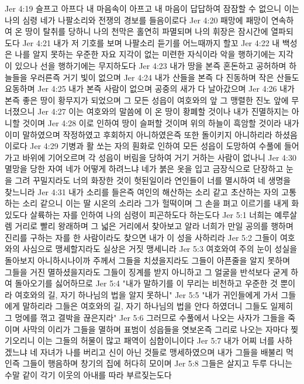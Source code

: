 Jer 4:19  슬프고 아프다 내 마음속이 아프고 내 마음이 답답하여 잠잠할 수 없으니 이는 나의 심령 네가 나팔소리와 전쟁의 경보를 들음이로다
Jer 4:20  패망에 패망이 연속하여 온 땅이 탈취를 당하니 나의 천막은 홀연히 파멸되며 나의 휘장은 잠시간에 열파되도다
Jer 4:21  내가 저 기호를 보며 나팔소리 듣기를 어느때까지 할꼬
Jer 4:22  내 백성은 나를 알지 못하는 우준한 자요 지각이 없는 미련한 자식이라 악을 행하기에는 지각이 있으나 선을 행하기에는 무지하도다
Jer 4:23  내가 땅을 본즉 혼돈하고 공허하며 하늘들을 우러른즉 거기 빛이 없으며
Jer 4:24  내가 산들을 본즉 다 진동하며 작은 산들도 요동하며
Jer 4:25  내가 본즉 사람이 없으며 공중의 새가 다 날아갔으며
Jer 4:26  내가 본즉 좋은 땅이 황무지가 되었으며 그 모든 성읍이 여호와의 앞 그 맹렬한 진노 앞에 무너졌으니
Jer 4:27  이는 여호와의 말씀에 이 온 땅이 황폐할 것이나 내가 진멸하지는 아니할 것이며
Jer 4:28  이로 인하여 땅이 슬퍼할 것이며 위의 하늘이 흑암할 것이라 내가 이미 말하였으며 작정하였고 후회하지 아니하였은즉 또한 돌이키지 아니하리라 하셨음이로다
Jer 4:29  기병과 활 쏘는 자의 훤화로 인하여 모든 성읍이 도망하여 수풀에 들어가고 바위에 기어오르며 각 성읍이 버림을 당하여 거기 거하는 사람이 없나니
Jer 4:30  멸망을 당한 자여 네가 어떻게 하려느냐 네가 붉은 옷을 입고 금장식으로 단장하고 눈을 그려 꾸밀지라도 너의 화장한 것이 헛된일이라 연인들이 너를 멸시하여 네 생명을 찾느니라
Jer 4:31  내가 소리를 들은즉 여인의 해산하는 소리 같고 초산하는 자의 고통하는 소리 같으니 이는 딸 시온의 소리라 그가 헐떡이며 그 손을 펴고 이르기를 내게 화 있도다 살륙하는 자를 인하여 나의 심령이 피곤하도다 하는도다
Jer 5:1  너희는 예루살렘 거리로 빨리 왕래하며 그 넓은 거리에서 찾아보고 알라 너희가 만일 공의를 행하며 진리를 구하는 자를 한 사람이라도 찾으면 내가 이 성을 사하리라
Jer 5:2  그들이 여호와의 사심으로 맹세할지라도 실상은 거짓 맹세니라
Jer 5:3  여호와여 주의 눈이 성실을 돌아보지 아니하시나이까 주께서 그들을 치셨을지라도 그들이 아픈줄을 알지 못하며 그들을 거진 멸하셨을지라도 그들이 징계를 받지 아니하고 그 얼굴을 반석보다 굳게 하여 돌아오기를 싫어하므로
Jer 5:4  "내가 말하기를 이 무리는 비천하고 우준한 것 뿐이라 여호와의 길, 자기 하나님의 법을 알지 못하니"
Jer 5:5  "내가 귀인들에게 가서 그들에게 말하리라 그들은 여호와의 길, 자기 하나님의 법을 안다 하였더니 그들도 일제히 그 멍에를 꺾고 결박을 끊은지라"
Jer 5:6  그러므로 수풀에서 나오는 사자가 그들을 죽이며 사막의 이리가 그들을 멸하며 표범이 성읍들을 엿보온즉 그리로 나오는 자마다 찢기오리니 이는 그들의 허물이 많고 패역이 심함이니이다
Jer 5:7  내가 어찌 너를 사하겠느냐 네 자녀가 나를 버리고 신이 아닌 것들로 맹세하였으며 내가 그들을 배불리 먹인즉 그들이 행음하며 창기의 집에 허다히 모이며
Jer 5:8  그들은 살지고 두루 다니는 수말 같이 각기 이웃의 아내를 따라 부르짖는도다
